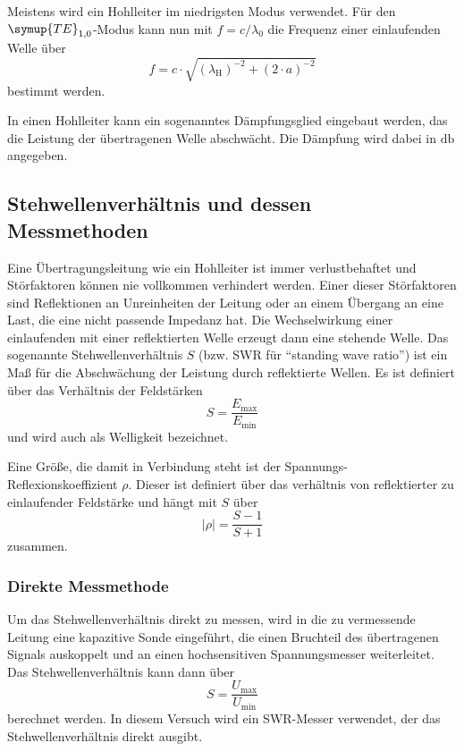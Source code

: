 Meistens wird ein Hohlleiter im niedrigsten Modus verwendet.
Für den $\symup{TE}_{1,0}$-Modus kann nun mit $f=c/\lambda_0$ die Frequenz einer einlaufenden Welle über
\begin{equation}
    f = c \cdot \sqrt{ \left( \lambda_\text{H} \right)^{-2} + \left( 2 \cdot a \right)^{-2} }
    \label{eq:frequenz}
\end{equation}
bestimmt werden.

In einen Hohlleiter kann ein sogenanntes Dämpfungsglied eingebaut werden, das die Leistung der übertragenen Welle abschwächt.
Die Dämpfung wird dabei in $\si{\decibel}$ angegeben.

\subsection{Stehwellenverhältnis und dessen Messmethoden}
\label{ssec:Stehwellenverhältnis}

Eine Übertragungsleitung wie ein Hohlleiter ist immer verlustbehaftet und Störfaktoren können nie vollkommen verhindert werden.
Einer dieser Störfaktoren sind Reflektionen an Unreinheiten der Leitung oder an einem Übergang an eine Last, die eine nicht passende Impedanz hat.
Die Wechselwirkung einer einlaufenden mit einer reflektierten Welle erzeugt dann eine stehende Welle.
Das sogenannte Stehwellenverhältnis $S$ (bzw. SWR für \enquote{standing wave ratio}) ist ein Maß für die Abschwächung der Leistung durch reflektierte Wellen.
Es ist definiert über das Verhältnis der Feldstärken
\begin{equation}
    S = \frac{E_\text{max}}{E_\text{min}}
\end{equation}
und wird auch als Welligkeit bezeichnet.

Eine Größe, die damit in Verbindung steht ist der Spannungs-Reflexionskoeffizient $\rho$.
Dieser ist definiert über das verhältnis von reflektierter zu einlaufender Feldstärke 
und hängt mit $S$ über
\begin{equation}
    | \rho | = \frac{S-1}{S+1}
\end{equation}
zusammen.

\subsubsection{Direkte Messmethode}
\label{sssec:Direkte_Messmethode}

Um das Stehwellenverhältnis direkt zu messen, wird in die zu vermessende Leitung eine kapazitive Sonde eingeführt, 
die einen Bruchteil des übertragenen Signals auskoppelt und an einen hochsensitiven Spannungsmesser weiterleitet.
Das Stehwellenverhältnis kann dann über
\begin{equation}
    S = \frac{U_\text{max}}{U_\text{min}}
    \label{eq:Direkte_Methode}
\end{equation}
berechnet werden.
In diesem Versuch wird ein SWR-Messer verwendet, der das Stehwellenverhältnis direkt ausgibt.

